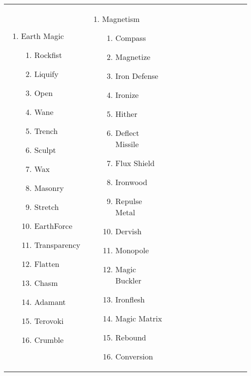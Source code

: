 \renewcommand{\labelenumii}{\arabic{enumii}.}
\begin{tabular}{@{} p{0.33\linewidth} p{0.33\linewidth} p{0.33\linewidth}}
\begin{enumerate}
	\item Earth Magic
	\begin{enumerate}
		\item Rockfist
		\item Liquify
		\item Open
		\item Wane
		\item Trench
		\item Sculpt
		\item Wax
		\item Masonry
		\item Stretch
		\item EarthForce
		\item Transparency
		\item Flatten
		\item Chasm
		\item Adamant
		\item Terovoki
		\item Crumble
	\end{enumerate}
\end{enumerate} &
\begin{enumerate}
	\item Magnetism
	\begin{enumerate}
		\item Compass
		\item Magnetize
		\item Iron Defense
		\item Ironize
		\item Hither
		\item Deflect Missile
		\item Flux Shield
		\item Ironwood
		\item Repulse Metal
		\item Dervish
		\item Monopole
		\item Magic Buckler
		\item Ironflesh
		\item Magic Matrix
		\item Rebound
		\item Conversion
	\end{enumerate}
\end{enumerate} &
\begin{enumerate}

\end{enumerate}
\end{tabular}
